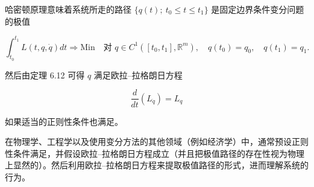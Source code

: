 哈密顿原理意味着系统所走的路径 $ \{ q(t) ;\ t_{0} \le t \le t_{1} \} $ 是固定边界条件变分问题的极值

\[
\int_{t_{0}}^{t_{1}}L(t, q, \dot{q}) dt \Rightarrow \mathrm{Min} \quad \text{对 } q \in C^{1}([t_{0}, t_{1}], \mathbb{R}^{m}) , \quad q(t_{0}) = q_{0} , \quad q(t_{1}) = q_{1} .
\]

然后由定理 6.12 可得 $ q $ 满足欧拉–拉格朗日方程

\[
\frac{d}{dt}(L_{\dot{q}}) = L_{q}
\]

如果适当的正则性条件也满足。

在物理学、工程学以及使用变分方法的其他领域（例如经济学）中，通常预设正则性条件满足，并假设欧拉–拉格朗日方程成立（并且把极值路径的存在性视为物理上显然的）。然后利用欧拉–拉格朗日方程来提取极值路径的形式，进而理解系统的行为。

